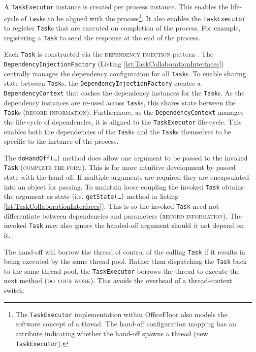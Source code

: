 \documentclass[prodmode]{style/acmlarge}
\begin{document}
A \texttt{TaskExecutor} instance is created per process instance.  This enables
the life-cycle of \texttt{Task}s to be aligned with the process\footnote{The
\texttt{TaskExecutor} implementation within OfficeFloor also models the software
concept of a thread.  The hand-off configuration mapping has an attribute
indicating whether the hand-off spawns a thread (new \texttt{TaskExecutor}).}.
It also enables the \texttt{TaskExecutor} to register \texttt{Task}s that are
executed on completion of the process.  For example, registering a \texttt{Task}
to send the response at the end of the process.

Each \texttt{Task} is constructed via the \textsc{dependency injection} pattern
\cite{ioc}.  The \texttt{Dependency\-InjectionFactory} (Listing
\ref{lst:TaskCollaborationInterfaces}) centrally manages the dependency
configuration for all \texttt{Task}s.  To enable sharing state between
\texttt{Task}s, the \texttt{Dependency\-InjectionFactory} creates a
\texttt{Depend\-ency\-Context} that caches the dependency instances for the
\texttt{Task}s.  As the dependency instances are re-used across \texttt{Task}s,
this shares state between the \texttt{Task}s (\textsc{record information}).
Furthermore, as the \texttt{Dependency\-Context} manages the life-cycle of
dependencies, it is aligned to the \texttt{TaskExecutor} life-cycle.
This enables both the dependencies of the \texttt{Task}s and the \texttt{Task}s
themselves to be specific to the instance of the process.

The \texttt{doHandOff(\ldots)} method does allow one argument to be passed to
the invoked \texttt{Task} (\textsc{complete the form}).  This is for more
intuitive development by passed state with the hand-off.  If multiple arguments
are required they are encapsulated into an object for passing.
To maintain loose coupling the invoked \texttt{Task} obtains the argument as
state (i.e. \texttt{getState(\ldots)} method in listing
\ref{lst:TaskCollaborationInterfaces}).  This is so the invoked \texttt{Task}
need not differentiate between dependencies and parameters (\textsc{record
information}).  The invoked \texttt{Task} may also ignore the handed-off
argument should it not depend on it.

The hand-off will borrow the thread of control of the calling \texttt{Task} if
it results in being executed by the same thread pool.  Rather than dispatching
the \texttt{Task} back to the same thread pool, the \texttt{TaskExecutor}
borrows the thread to execute the next method (\textsc{do your work}). This
avoids the overhead of a thread-context switch.
\end{document}
